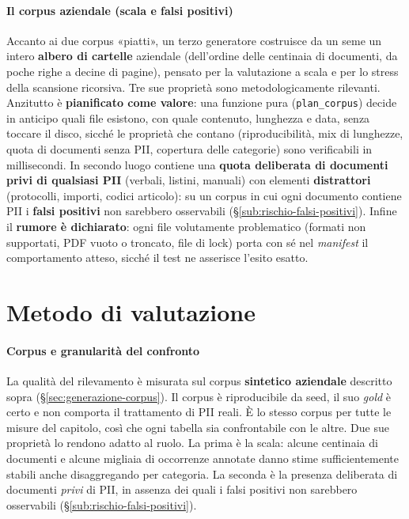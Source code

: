 \paragraph*{Il corpus aziendale (scala e falsi positivi)} Accanto ai due corpus «piatti», un terzo generatore costruisce da un seme un intero \textbf{albero di cartelle} aziendale (dell'ordine delle centinaia di documenti, da poche righe a decine di pagine), pensato per la valutazione a scala e per lo stress della scansione ricorsiva. Tre sue proprietà sono metodologicamente rilevanti. Anzitutto è \textbf{pianificato come valore}: una funzione pura (\texttt{plan\_corpus}) decide in anticipo quali file esistono, con quale contenuto, lunghezza e data, senza toccare il disco, sicché le proprietà che contano (riproducibilità, mix di lunghezze, quota di documenti senza PII, copertura delle categorie) sono verificabili in millisecondi. In secondo luogo contiene una \textbf{quota deliberata di documenti privi di qualsiasi PII} (verbali, listini, manuali) con elementi \textbf{distrattori} (protocolli, importi, codici articolo): su un corpus in cui ogni documento contiene PII i \textbf{falsi positivi} non sarebbero osservabili (§\ref{sub:rischio-falsi-positivi}). Infine il \textbf{rumore è dichiarato}: ogni file volutamente problematico (formati non supportati, PDF vuoto o troncato, file di lock) porta con sé nel \textit{manifest} il comportamento atteso, sicché il test ne asserisce l'esito esatto.

\section{Metodo di valutazione}
\label{sec:test-metodo}

\paragraph*{Corpus e granularità del confronto} La qualità del rilevamento è misurata sul corpus \textbf{sintetico aziendale} descritto sopra (§\ref{sec:generazione-corpus}). Il corpus è riproducibile da seed, il suo \textit{gold} è certo e non comporta il trattamento di PII reali. È lo stesso corpus per tutte le misure del capitolo, così che ogni tabella sia confrontabile con le altre. Due sue proprietà lo rendono adatto al ruolo. La prima è la scala: alcune centinaia di documenti e alcune migliaia di occorrenze annotate danno stime sufficientemente stabili anche disaggregando per categoria. La seconda è la presenza deliberata di documenti \emph{privi} di PII, in assenza dei quali i falsi positivi non sarebbero osservabili (§\ref{sub:rischio-falsi-positivi}).

